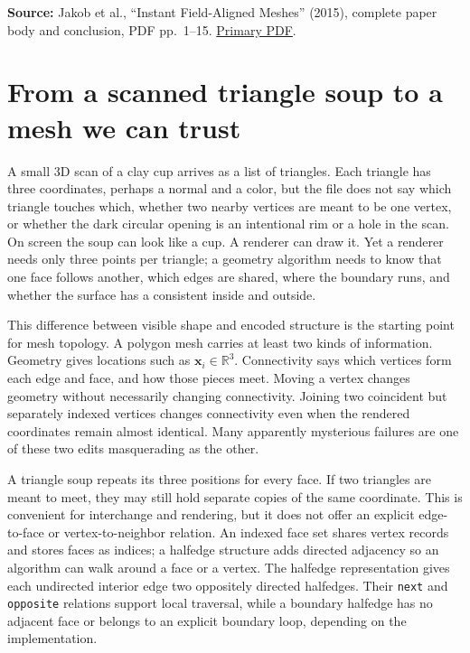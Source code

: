 \textbf{Source:} Jakob et al., ``Instant Field-Aligned Meshes'' (2015), complete paper body and conclusion, PDF pp.~1--15. \href{https://igl.ethz.ch/projects/instant-meshes/instant-meshes-SA-2015-jakob-et-al-compressed.pdf}{Primary PDF}.

\section{From a scanned triangle soup to a mesh we can trust}\label{03-visual-computing-i-ch002-from-a-scanned-triangle-soup-to-a-mesh-we-can-trust}

\hypertarget{03-visual-computing-i-ch002-from-a-scanned-triangle-soup-to-a-mesh-we-can-trust}{}

A small 3D scan of a clay cup arrives as a list of triangles. Each triangle has three coordinates, perhaps a normal and a color, but the file does not say which triangle touches which, whether two nearby vertices are meant to be one vertex, or whether the dark circular opening is an intentional rim or a hole in the scan. On screen the soup can look like a cup. A renderer can draw it. Yet a renderer needs only three points per triangle; a geometry algorithm needs to know that one face follows another, which edges are shared, where the boundary runs, and whether the surface has a consistent inside and outside.

This difference between visible shape and encoded structure is the starting point for mesh topology. A polygon mesh carries at least two kinds of information. Geometry gives locations such as \(\mathbf x_i\in\mathbb R^3\). Connectivity says which vertices form each edge and face, and how those pieces meet. Moving a vertex changes geometry without necessarily changing connectivity. Joining two coincident but separately indexed vertices changes connectivity even when the rendered coordinates remain almost identical. Many apparently mysterious failures are one of these two edits masquerading as the other.

A triangle soup repeats its three positions for every face. If two triangles are meant to meet, they may still hold separate copies of the same coordinate. This is convenient for interchange and rendering, but it does not offer an explicit edge-to-face or vertex-to-neighbor relation. An indexed face set shares vertex records and stores faces as indices; a halfedge structure adds directed adjacency so an algorithm can walk around a face or a vertex. The halfedge representation gives each undirected interior edge two oppositely directed halfedges. Their \texttt{next} and \texttt{opposite} relations support local traversal, while a boundary halfedge has no adjacent face or belongs to an explicit boundary loop, depending on the implementation.


